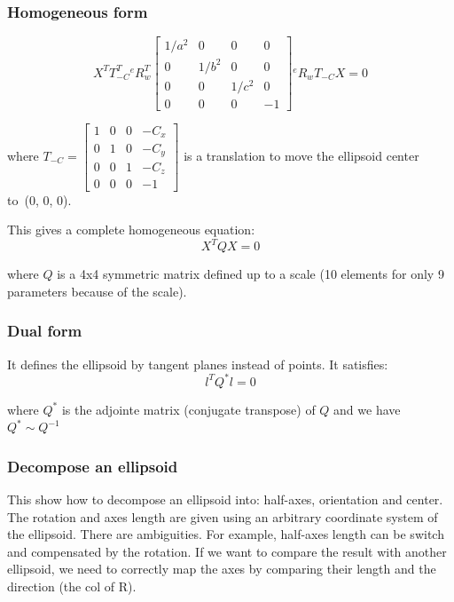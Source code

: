 \subsubsection{Homogeneous form}
\begin{equation}
    X^T T_{-C}^T
    {}^{e}R_{w}^T
    \left[ \begin{array}{cccc}
    1/a^2 & 0 & 0 & 0\\
    0 & 1/b^2 & 0 & 0\\
    0 & 0 & 1/c^2 & 0\\
    0 & 0 & 0 & -1
    \end{array}\right]
    {}^{e}R_{w}
    T_{-C}
    X = 0
\end{equation}

where $T_{-C} = \left[\begin{array}{cccc}
    1&0&0&-C_x \\
    0&1&0&-C_y \\
    0&0&1&-C_z \\
    0&0&0&-1
    \end{array}\right]$ is a translation to move the ellipsoid center to~(0, 0, 0).

This gives a complete homogeneous equation:
\begin{equation}
    X^T Q X = 0
\end{equation}

where $Q$ is a 4x4 symmetric matrix defined up to a scale (10 elements for only 9 parameters because of the scale).

\subsubsection{Dual form}
It defines the ellipsoid by tangent planes instead of points. It satisfies:
\begin{equation}
    l^T Q^* l = 0
\end{equation}

where $Q^*$ is the adjointe matrix (conjugate transpose) of $Q$ and we have $Q^* \sim Q^{-1}$


\subsubsection{Decompose an ellipsoid}
This show how to decompose an ellipsoid into: half-axes, orientation and center. The rotation and axes length are given using an arbitrary coordinate system of the ellipsoid. There are ambiguities. For example, half-axes length can be switch and compensated by the rotation. If we want to compare the result with another ellipsoid, we need to correctly map the axes by comparing their length and the direction (the col of R).

